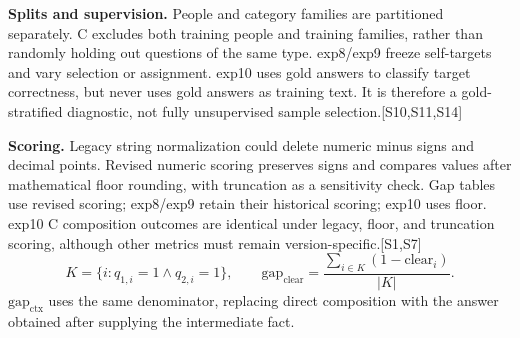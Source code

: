 \documentclass[11pt,a4paper]{article}
\newcommand{\src}[1]{{\scriptsize\color{ink}[#1]}}
\begin{document}
\textbf{Splits and supervision.} People and category families are partitioned separately. C excludes both training people and training families, rather than randomly holding out questions of the same type. exp8/exp9 freeze self-targets and vary selection or assignment. exp10 uses gold answers to classify target correctness, but never uses gold answers as training text. It is therefore a gold-stratified diagnostic, not fully unsupervised sample selection.\src{S10,S11,S14}

\textbf{Scoring.} Legacy string normalization could delete numeric minus signs and decimal points. Revised numeric scoring preserves signs and compares values after mathematical floor rounding, with truncation as a sensitivity check. Gap tables use revised scoring; exp8/exp9 retain their historical scoring; exp10 uses floor. exp10 C composition outcomes are identical under legacy, floor, and truncation scoring, although other metrics must remain version-specific.\src{S1,S7}
\[
K=\{i:q_{1,i}=1\land q_{2,i}=1\},\qquad
\mathrm{gap}_{\mathrm{clear}}=\frac{\sum_{i\in K}(1-\mathrm{clear}_i)}{|K|}.
\]
$\mathrm{gap}_{\mathrm{ctx}}$ uses the same denominator, replacing direct composition with the answer obtained after supplying the intermediate fact.
\end{document}
